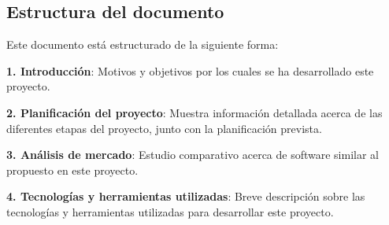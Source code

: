 \newpage

\subsection{Estructura del documento}

Este documento está estructurado de la siguiente forma:

\textbf{1. Introducción}: Motivos y objetivos por los cuales se ha desarrollado este proyecto.

\textbf{2. Planificación del proyecto}: Muestra información detallada acerca de las diferentes etapas del proyecto, junto con la planificación prevista.

\textbf{3. Análisis de mercado}: Estudio comparativo acerca de software similar al propuesto en este proyecto.

\textbf{4. Tecnologías y herramientas utilizadas}: Breve descripción sobre las tecnologías y herramientas utilizadas para desarrollar este proyecto.

\newpage

